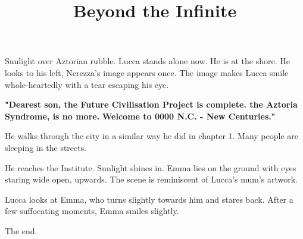 \documentclass[11pt]{article}
\begin{document}
\ttfamily
\title{Beyond the Infinite}
\maketitle

Sunlight over Aztorian rubble.
Lucca stands alone now. 
He is at the shore.
He looks to his left, Nerezza's image appears once.
The image makes Lucca smile whole-heartedly with a tear escaping his eye.

\textbf{"Dearest son, the Future Civilisation Project is complete. 
the Aztoria Syndrome, is no more.}
\textbf{Welcome to 0000 N.C. - New Centuries."}

He walks through the city in a similar way he did in chapter 1.
Many people are sleeping in the streets. 

He reaches the Institute.
Sunlight shines in. 
Emma lies on the ground with eyes staring wide open, upwards.
The scene is reminiscent of Lucca's mum's artwork.

Lucca looks at Emma, who turns slightly towards him and stares back.
After a few suffocating moments, Emma smiles slightly.

The end.
\end{document}
